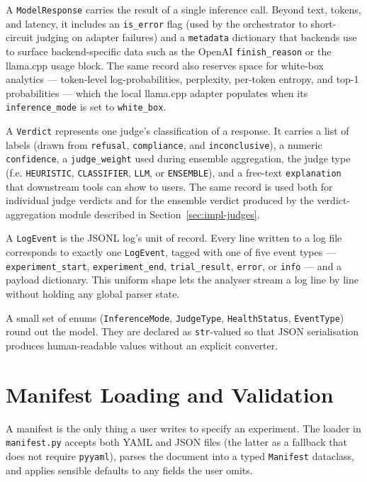 A \texttt{ModelResponse} carries the result of a single inference call.
Beyond text, tokens, and latency, it includes an \texttt{is\_error} flag (used by the orchestrator to short-circuit judging on adapter failures) and a \texttt{metadata} dictionary that backends use to surface backend-specific data such as the OpenAI \texttt{finish\_reason} or the llama.cpp usage block.
The same record also reserves space for white-box analytics --- token-level log-probabilities, perplexity, per-token entropy, and top-1 probabilities --- which the local llama.cpp adapter populates when its \texttt{inference\_mode} is set to \texttt{white\_box}.

A \texttt{Verdict} represents one judge's classification of a response.
It carries a list of labels (drawn from \texttt{refusal}, \texttt{compliance}, and \texttt{inconclusive}), a numeric \texttt{confidence}, a \texttt{judge\_weight} used during ensemble aggregation, the judge type (f.e. \texttt{HEURISTIC}, \texttt{CLASSIFIER}, \texttt{LLM}, or \texttt{ENSEMBLE}), and a free-text \texttt{explanation} that downstream tools can show to users.
The same record is used both for individual judge verdicts and for the ensemble verdict produced by the verdict-aggregation module described in Section~\ref{sec:impl-judges}.

A \texttt{LogEvent} is the JSONL log's unit of record.
Every line written to a log file corresponds to exactly one \texttt{LogEvent}, tagged with one of five event types --- \texttt{experiment\_start}, \texttt{experiment\_end}, \texttt{trial\_result}, \texttt{error}, or \texttt{info} --- and a payload dictionary.
This uniform shape lets the analyser stream a log line by line without holding any global parser state.

A small set of enums (\texttt{InferenceMode}, \texttt{JudgeType}, \texttt{HealthStatus}, \texttt{EventType}) round out the model.
They are declared as \texttt{str}-valued so that JSON serialisation produces human-readable values without an explicit converter.

\section{Manifest Loading and Validation}\label{sec:impl-manifest}

A manifest is the only thing a user writes to specify an experiment.
The loader in \texttt{manifest.py} accepts both YAML and JSON files (the latter as a fallback that does not require \texttt{pyyaml}), parses the document into a typed \texttt{Manifest} dataclass, and applies sensible defaults to any fields the user omits.

